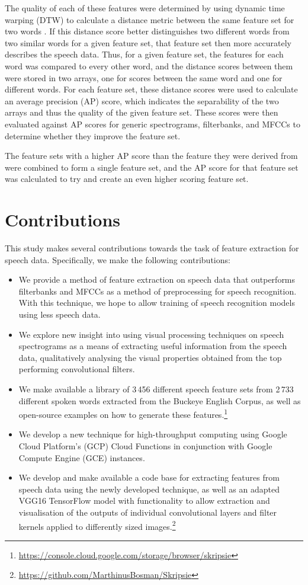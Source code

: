 The quality of each of these features were determined by using dynamic time warping (DTW) to calculate a distance metric between the same feature set for two words \cite{DBLP:conf/interspeech/CarlinTJH11}. If this distance score better distinguishes two different words from two similar words for a given feature set, that feature set then more accurately describes the speech data.
Thus, for a given feature set, the features for each word was compared to every other word, and the distance scores between them were stored in two arrays, one for scores between the same word and one for different words.
For each feature set, these distance scores were used to calculate an average precision (AP) score, which indicates the separability of the two arrays and thus the quality of the given feature set.
These scores were then evaluated against AP scores for generic spectrograms, filterbanks, and MFCCs to determine whether they improve the feature set.

The feature sets with a higher AP score than the feature they were derived from were combined to form a single feature set, and the AP score for that feature set was calculated to try and create an even higher scoring feature set.

\section{Contributions}

This study makes several contributions towards the task of feature extraction for speech data.
Specifically, we make the following contributions:

\begin{itemize}
\item We provide a method of feature extraction on speech data that outperforms filterbanks and MFCCs as a method of preprocessing for speech recognition.
With this technique, we hope to allow training of speech recognition models using less speech data.
\item We explore new insight into using visual processing techniques on speech spectrograms as a means of extracting useful information from the speech data, qualitatively analysing the visual properties obtained from the top performing convolutional filters.
\item We make available a library of 3\,456 different speech feature sets from 2\,733 different spoken words extracted from the Buckeye English Corpus, as well as open-source examples on how to generate these features.\footnote{\url{https://console.cloud.google.com/storage/browser/skripsie}}
\item We develop a new technique for high-throughput computing using Google Cloud Platform's (GCP) Cloud Functions in conjunction with Google Compute Engine (GCE) instances.
\item We develop and make available a code base for extracting features from speech data using the newly developed technique, as well as an adapted VGG16 TensorFlow model with functionality to allow extraction and visualisation of the outputs of individual convolutional layers and filter kernels applied to differently sized images.\footnote{\url{https://github.com/MarthinusBosman/Skripsie}}
\end{itemize}